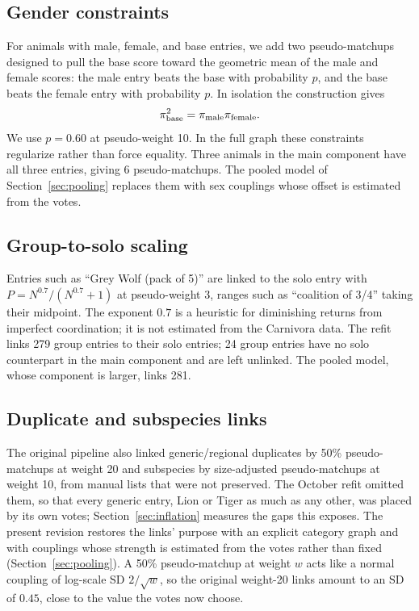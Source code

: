 \documentclass[11pt]{article}
\begin{document}
\subsection{Gender constraints}
For animals with male, female, and base entries, we add two pseudo-matchups designed to pull the base score toward the geometric mean of the male and female scores: the male entry beats the base with probability $p$, and the base beats the female entry with probability $p$. In isolation the construction gives
\[
\pi_{\rm base}^2=\pi_{\rm male}\pi_{\rm female}.
\]
We use $p=0.60$ at pseudo-weight 10. In the full graph these constraints regularize rather than force equality. Three animals in the main component have all three entries, giving 6 pseudo-matchups. The pooled model of Section~\ref{sec:pooling} replaces them with sex couplings whose offset is estimated from the votes.

\subsection{Group-to-solo scaling}
Entries such as ``Grey Wolf (pack of 5)'' are linked to the solo entry with $P=N^{0.7}/(N^{0.7}+1)$ at pseudo-weight 3, ranges such as ``coalition of 3/4'' taking their midpoint. The exponent $0.7$ is a heuristic for diminishing returns from imperfect coordination; it is not estimated from the Carnivora data. The refit links 279 group entries to their solo entries; 24 group entries have no solo counterpart in the main component and are left unlinked. The pooled model, whose component is larger, links 281.

\subsection{Duplicate and subspecies links}
The original pipeline also linked generic/regional duplicates by 50\% pseudo-matchups at weight 20 and subspecies by size-adjusted pseudo-matchups at weight 10, from manual lists that were not preserved. The October refit omitted them, so that every generic entry, Lion or Tiger as much as any other, was placed by its own votes; Section~\ref{sec:inflation} measures the gaps this exposes. The present revision restores the links' purpose with an explicit category graph and with couplings whose strength is estimated from the votes rather than fixed (Section~\ref{sec:pooling}). A 50\% pseudo-matchup at weight $w$ acts like a normal coupling of log-scale SD $2/\sqrt{w}$, so the original weight-20 links amount to an SD of $0.45$, close to the value the votes now choose.
\end{document}
